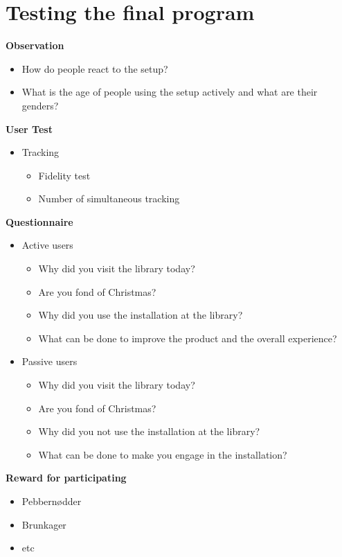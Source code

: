 \chapter{Testing the final program}
\textbf{Observation}
\begin{itemize}
\item How do people react to the setup?	
\item What is the age of people using the setup actively and what are their genders?
\end{itemize}

\textbf{User Test}
\begin{itemize}
\item Tracking
\begin{itemize}
\item Fidelity test
\item Number of simultaneous tracking
\end{itemize}
\end{itemize}

\textbf{Questionnaire}
\begin{itemize}
\item Active users
\begin{itemize}
\item Why did you visit the library today?
\item Are you fond of Christmas?
\item Why did you use the installation at the library?
\item What can be done to improve the product and the overall experience?
\end{itemize}
\item Passive users
\begin{itemize}
\item Why did you visit the library today?
\item Are you fond of Christmas?
\item Why did you not use the installation at the library?
\item What can be done to make you engage in the installation?
\end{itemize}
\end{itemize}
\textbf{Reward for participating}
\begin{itemize}
\item Pebbernødder
\item Brunkager
\item etc
\end{itemize}
